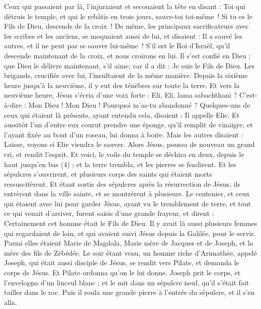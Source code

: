 \begin{multicols}{2}
{Ceux qui passaient par là, l’injuriaient et secouaient la tête
en disant : Toi qui détruis le temple, et qui le rebâtis en trois jours, sauve-toi toi-même ! Si tu es le Fils de Dieu, descends de la croix !
De même, les principaux sacrificateurs avec les scribes et les anciens, se moquaient aussi de lui, et disaient :
Il a sauvé les autres, et il ne peut pas se sauver lui-même ! S’il est le Roi d'Israël, qu'il descende maintenant de la croix, et nous croirons en lui.
Il s’est confié en Dieu ; que Dieu le délivre maintenant, s’il aime, car il a dit : Je suis le Fils de Dieu.
Les brigands, crucifiés avec lui, l’insultaient de la même manière.
Depuis la sixième heure jusqu’à la neuvième, il y eut des ténèbres sur toute la terre.
Et vers la neuvième heure, Jésus s'écria d’une voix forte : Eli, Eli, lama sabachthani ? C’est-à-dire : Mon Dieu ! Mon Dieu ! Pourquoi m'as-tu abandonné ?
Quelques-uns de ceux qui étaient là présents, ayant entendu cela, disaient : Il appelle Elie.
Et aussitôt l’un d'entre eux courut prendre une éponge, qu’il remplit de vinaigre, et l’ayant fixée au bout d'un roseau, lui donna à boire.
Mais les autres disaient : Laisse, voyons si Elie viendra le sauver.
Alors Jésus, poussa de nouveau un grand cri, et rendit l'esprit.
Et voici, le voile du temple se déchira en deux, depuis le haut jusqu'en bas (4) ; et la terre trembla, et les pierres se fendirent.
Et les sépulcres s'ouvrirent, et plusieurs corps des saints qui étaient morts ressuscitèrent.
Et étant sortis des sépulcres après la résurrection de Jésus, ils entrèrent dans la ville sainte, et se montrèrent à plusieurs.
Le centenier, et ceux qui étaient avec lui pour garder Jésus, ayant vu le tremblement de terre, et tout ce qui venait d'arriver, furent saisis d’une grande frayeur, et dirent : Certainement cet homme était le Fils de Dieu.
Il y avait là aussi plusieurs femmes qui regardaient de loin, et qui avaient suivi Jésus depuis la Galilée, pour le servir.
Parmi elles étaient Marie de Magdala, Marie mère de Jacques et de Joseph, et la mère des fils de Zébédée.
\TextTitle{[Ensevelissement]}
Le soir étant venu, un homme riche d'Arimathée, appelé Joseph, qui était aussi disciple de Jésus,
se rendit vers Pilate, et demanda le corps de Jésus. Et Pilate ordonna qu’on le lui donne.
Joseph prit le corps, et l'enveloppa d'un linceul blanc ;
et le mit dans un sépulcre neuf, qu'il s’était fait tailler dans le roc. Puis il roula une grande pierre à l'entrée du sépulcre, et il s'en alla.
}
\end{multicols}
